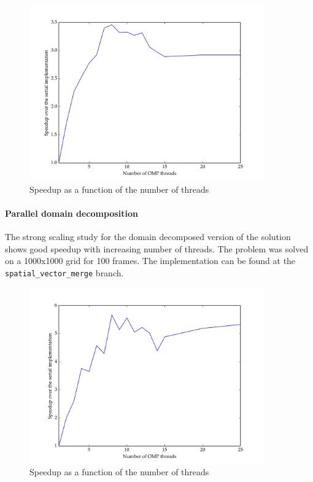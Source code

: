 \documentclass[11pt]{article}
\begin{document}
\begin{figure}[H]
    \includegraphics[width=0.9\textwidth]{./strong_scaling/strong_scaling_vector_parallel.png}
    \caption{Speedup as a function of the number of threads}
    \label{fig:strong_scaling}
\end{figure} 


\paragraph{Parallel domain decomposition}

The strong scaling study for the domain decomposed version of the solution shows good speedup with increasing number of threads. The problem was solved on a 1000x1000 grid for 100 frames. The implementation can be found at the \texttt{spatial\_vector\_merge} branch.

\begin{figure}[H]
    \includegraphics[width=0.9\textwidth]{./strong_scaling/strong_scaling.png}
    \caption{Speedup as a function of the number of threads}
    \label{fig:strong_scaling_dd}
\end{figure} 
\end{document}
